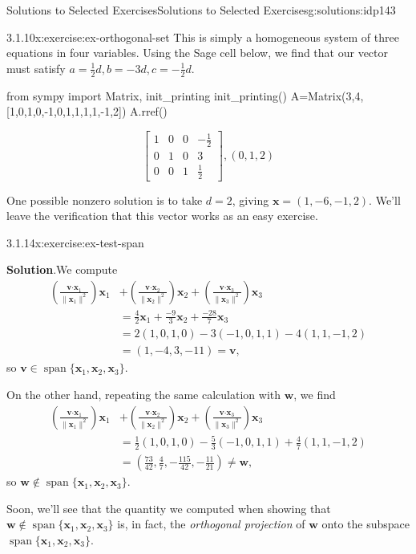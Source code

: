 \documentclass[oneside,10pt,]{book}
\newcommand{\blocktitlefont}{\relax}
\numberwithin{equation}{section}
\newcommand{\spn}{\operatorname{span}}
\newcommand{\bbm}{\begin{bmatrix}}
\newcommand{\ebm}{\end{bmatrix}}
\newcommand{\dotp}{\!\boldsymbol{\cdot}\!}
\newcommand{\len}[1]{\lVert #1\rVert}
\newcommand{\vv}{\mathbf{v}}
\newcommand{\ww}{\mathbf{w}}
\newcommand{\xx}{\mathbf{x}}
\newcommand{\amp}{&}
\begin{document}
\begin{solutions-chapter}{Solutions to Selected Exercises}{}{Solutions to Selected Exercises}{}{}{g:solutions:idp143}
\begin{inlinesolution}{3.1.10}{}{x:exercise:ex-orthogonal-set}
This is simply a homogeneous system of three equations in four variables. Using the Sage cell below, we find that our vector must satisfy \(a=\frac12 d, b = -3d, c=-\frac12 d\).%
\begin{sageinput}
from sympy import Matrix, init_printing
init_printing()
A=Matrix(3,4,[1,0,1,0,-1,0,1,1,1,1,-1,2])
A.rref()
\end{sageinput}
\begin{sageoutput}
\[\bbm 1\amp 0\amp 0\amp -\frac12\\ 0\amp 1\amp 0\amp 3\\ 0\amp 0\amp 1\amp \frac12\ebm, (0,1,2)\]
\end{sageoutput}
One possible nonzero solution is to take \(d=2\), giving \(\xx=(1,-6,-1,2)\). We'll leave the verification that this vector works as an easy exercise.%
\end{inlinesolution}%
\begin{inlinesolution}{3.1.14}{}{x:exercise:ex-test-span}%
\par\smallskip%
\noindent\textbf{\blocktitlefont Solution}.\hypertarget{g:solution:idp168-back}{}\quad{}We compute%
\begin{align*}
\left(\frac{\vv\dotp\xx_1}{\len{\xx_1}^2}\right)\xx_1
\amp +\left(\frac{\vv\dotp\xx_2}{\len{\xx_2}^2}\right)\xx_2
+\left(\frac{\vv\dotp\xx_3}{\len{\xx_3}^2}\right)\xx_3\\
\amp = \frac{4}{2}\xx_1+\frac{-9}{3}\xx_2+\frac{-28}{7}\xx_3\\
\amp = 2(1,0,1,0)-3(-1,0,1,1)-4(1,1,-1,2)\\
\amp = (1,-4,3,-11) = \vv\text{,}
\end{align*}
so \(\vv\in\spn\{\xx_1,\xx_2,\xx_3\}\).%
\par
On the other hand, repeating the same calculation with \(\ww\), we find%
\begin{align*}
\left(\frac{\vv\dotp\xx_1}{\len{\xx_1}^2}\right)\xx_1
\amp +\left(\frac{\vv\dotp\xx_2}{\len{\xx_2}^2}\right)\xx_2
+\left(\frac{\vv\dotp\xx_3}{\len{\xx_3}^2}\right)\xx_3\\
\amp =\frac12 (1,0,1,0)-\frac53 (-1,0,1,1) +\frac47 (1,1,-1,2)\\
\amp = \left(\frac{73}{42},\frac47,-\frac{115}{42},-\frac{11}{21}\right)\neq \ww\text{,}
\end{align*}
so \(\ww\notin\spn\{\xx_1,\xx_2,\xx_3\}\).%
\par
Soon, we'll see that the quantity we computed when showing that \(\ww\notin\spn\{\xx_1,\xx_2,\xx_3\}\) is, in fact, the \emph{orthogonal projection} of \(\ww\) onto the subspace \(\spn\{\xx_1,\xx_2,\xx_3\}\).%

\end{inlinesolution}
\end{solutions-chapter}
\end{document}
